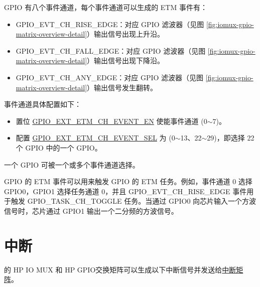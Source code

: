 \documentclass[main\_\_CN.tex]{subfiles}
\begin{document}
GPIO 有八个事件通道，每个事件通道可以生成的 ETM 事件有：

\begin{itemize}
    \item GPIO\_EVT\_CH\_RISE\_EDGE：对应 GPIO 滤波器（见图 \ref{fig:iomux-gpio-matrix-overview-detail}）输出信号出现上升沿。
    \item GPIO\_EVT\_CH\_FALL\_EDGE：对应 GPIO 滤波器（见图 \ref{fig:iomux-gpio-matrix-overview-detail}）输出信号出现下降沿。
    \item GPIO\_EVT\_CH\_ANY\_EDGE：对应 GPIO 滤波器（见图 \ref{fig:iomux-gpio-matrix-overview-detail}）输出信号发生翻转。
\end{itemize}

事件通道具体配置如下：

\begin{itemize}
    \item 置位 \hyperref[fielddesc:GPIOEXTETMCHNEVENTEN]{GPIO\_EXT\_ETM\_CH\_EVENT\_EN} 使能事件通道  (0$\sim$7)。
    \item 配置 \hyperref[fielddesc:GPIOEXTETMCHNEVENTSEL]{GPIO\_EXT\_ETM\_CH\_EVENT\_SEL} 为  (0$\sim$13、22$\sim$29)，即选择 22 个 GPIO 中的一个 GPIO。
\end{itemize}

\begin{tiplisting}
 一个 GPIO 可被一个或多个事件通道选择。
\end{tiplisting}

GPIO 的 ETM 事件可以用来触发 GPIO 的 ETM 任务。例如，事件通道 0 选择 GPIO0，GPIO1 选择任务通道 0，并且 GPIO\_EVT\_CH\_RISE\_EDGE 事件用于触发 GPIO\_TASK\_CH\_TOGGLE 任务。当通过 GPIO0 向芯片输入一个方波信号时，芯片通过 GPIO1 输出一个二分频的方波信号。

\section{中断}

\chipname{} 的 HP IO MUX 和 HP GPIO交换矩阵可以生成以下中断信号并发送给\hyperref[mod:intmtrx]{中断矩阵}。
\end{document}
